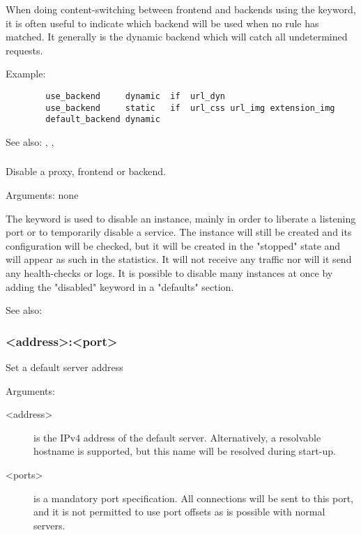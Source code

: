   When doing content-switching between frontend and backends using the
   keyword, it is often useful to indicate which backend will be
  used when no rule has matched. It generally is the dynamic backend which
  will catch all undetermined requests.

  Example:
  \begin{verbatim}
        use_backend     dynamic  if  url_dyn
        use_backend     static   if  url_css url_img extension_img
        default_backend dynamic
  \end{verbatim}


See also: , , 

\subsubsection[disabled]{}

  Disable a proxy, frontend or backend.
  

  Arguments: none

  The  keyword is used to disable an instance, mainly in order to
  liberate a listening port or to temporarily disable a service. The instance
  will still be created and its configuration will be checked, but it will be
  created in the "stopped" state and will appear as such in the statistics. It
  will not receive any traffic nor will it send any health-checks or logs. It
  is possible to disable many instances at once by adding the "disabled"
  keyword in a "defaults" section.


See also: 

\subsubsection[dispatch]{ <address>:<port>}

  Set a default server address
  
  
  Arguments:
  \begin{description}
  \item[<address>] is the IPv4 address of the default server. Alternatively, a
              resolvable hostname is supported, but this name will be resolved
              during start-up.

  \item[<ports>]   is a mandatory port specification. All connections will be sent
              to this port, and it is not permitted to use port offsets as is
              possible with normal servers.
  \end{description}

